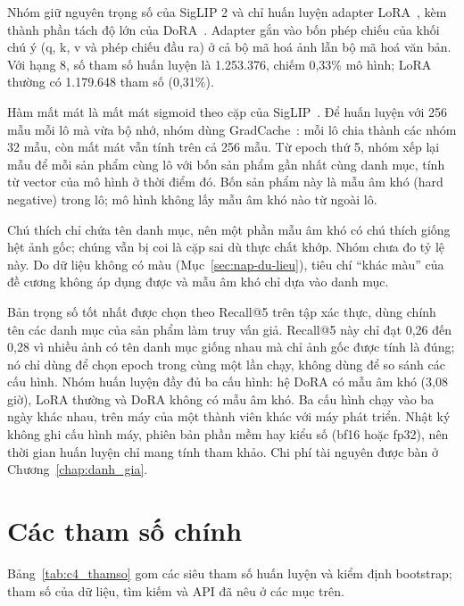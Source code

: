 Nhóm giữ nguyên trọng số của SigLIP 2 và chỉ huấn luyện adapter LoRA~\cite{hu2022lora}, kèm thành phần tách độ lớn của DoRA~\cite{liu2024dora}. Adapter gắn vào bốn phép chiếu của khối chú ý (q, k, v và phép chiếu đầu ra) ở cả bộ mã hoá ảnh lẫn bộ mã hoá văn bản. Với hạng 8, số tham số huấn luyện là 1.253.376, chiếm 0,33\% mô hình; LoRA thường có 1.179.648 tham số (0,31\%).

Hàm mất mát là mất mát sigmoid theo cặp của SigLIP~\cite{zhai2023siglip}. Để huấn luyện với 256 mẫu mỗi lô mà vừa bộ nhớ, nhóm dùng GradCache~\cite{gao2021gradcache}: mỗi lô chia thành các nhóm 32 mẫu, còn mất mát vẫn tính trên cả 256 mẫu. Từ epoch thứ 5, nhóm xếp lại mẫu để mỗi sản phẩm cùng lô với bốn sản phẩm gần nhất cùng danh mục, tính từ vector của mô hình ở thời điểm đó. Bốn sản phẩm này là mẫu âm khó (hard negative) trong lô; mô hình không lấy mẫu âm khó nào từ ngoài lô.

Chú thích chỉ chứa tên danh mục, nên một phần mẫu âm khó có chú thích giống hệt ảnh gốc; chúng vẫn bị coi là cặp sai dù thực chất khớp. Nhóm chưa đo tỷ lệ này. Do dữ liệu không có màu (Mục~\ref{sec:nap-du-lieu}), tiêu chí ``khác màu'' của đề cương không áp dụng được và mẫu âm khó chỉ dựa vào danh mục.

Bản trọng số tốt nhất được chọn theo Recall@5 trên tập xác thực, dùng chính tên các danh mục của sản phẩm làm truy vấn giả. Recall@5 này chỉ đạt 0,26 đến 0,28 vì nhiều ảnh có tên danh mục giống nhau mà chỉ ảnh gốc được tính là đúng; nó chỉ dùng để chọn epoch trong cùng một lần chạy, không dùng để so sánh các cấu hình. Nhóm huấn luyện đầy đủ ba cấu hình: hệ DoRA có mẫu âm khó (3,08 giờ), LoRA thường và DoRA không có mẫu âm khó. Ba cấu hình chạy vào ba ngày khác nhau, trên máy của một thành viên khác với máy phát triển. Nhật ký không ghi cấu hình máy, phiên bản phần mềm hay kiểu số (bf16 hoặc fp32), nên thời gian huấn luyện chỉ mang tính tham khảo. Chi phí tài nguyên được bàn ở Chương~\ref{chap:danh_gia}.

\section{Các tham số chính}
\label{sec:tham-so}

Bảng~\ref{tab:c4_thamso} gom các siêu tham số huấn luyện và kiểm định bootstrap; tham số của dữ liệu, tìm kiếm và API đã nêu ở các mục trên.

